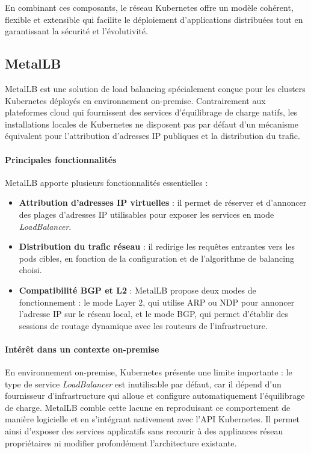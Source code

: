 En combinant ces composants, le réseau Kubernetes offre un modèle cohérent, flexible et extensible qui facilite le déploiement d’applications distribuées tout en garantissant la sécurité et l’évolutivité.

\subsection{MetalLB}

MetalLB est une solution de load balancing spécialement conçue pour les clusters Kubernetes déployés en environnement on-premise. Contrairement aux plateformes cloud qui fournissent des services d’équilibrage de charge natifs, les installations locales de Kubernetes ne disposent pas par défaut d’un mécanisme équivalent pour l’attribution d’adresses IP publiques et la distribution du trafic.

\paragraph{Principales fonctionnalités}

MetalLB apporte plusieurs fonctionnalités essentielles :
\begin{itemize}
	\item \textbf{Attribution d’adresses IP virtuelles} : il permet de réserver et d’annoncer des plages d’adresses IP utilisables pour exposer les services en mode \emph{LoadBalancer}.
	\item \textbf{Distribution du trafic réseau} : il redirige les requêtes entrantes vers les pods cibles, en fonction de la configuration et de l’algorithme de balancing choisi.
	\item \textbf{Compatibilité BGP et L2} : MetalLB propose deux modes de fonctionnement : le mode Layer 2, qui utilise ARP ou NDP pour annoncer l’adresse IP sur le réseau local, et le mode BGP, qui permet d’établir des sessions de routage dynamique avec les routeurs de l’infrastructure.
\end{itemize}

\paragraph{Intérêt dans un contexte on-premise}

En environnement on-premise, Kubernetes présente une limite importante : le type de service \emph{LoadBalancer} est inutilisable par défaut, car il dépend d’un fournisseur d’infrastructure qui alloue et configure automatiquement l’équilibrage de charge. MetalLB comble cette lacune en reproduisant ce comportement de manière logicielle et en s’intégrant nativement avec l’API Kubernetes. Il permet ainsi d’exposer des services applicatifs sans recourir à des appliances réseau propriétaires ni modifier profondément l’architecture existante.


